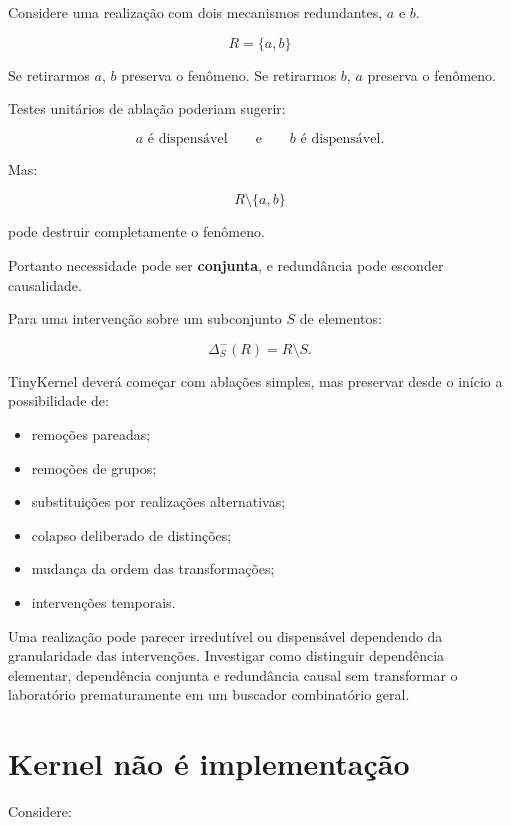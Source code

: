 \documentclass[11pt,a4paper]{article}
\begin{document}
Considere uma realização com dois mecanismos redundantes, \(a\) e \(b\).

\[
R=\{a,b\}
\]

Se retirarmos \(a\), \(b\) preserva o fenômeno.
Se retirarmos \(b\), \(a\) preserva o fenômeno.

Testes unitários de ablação poderiam sugerir:

\[
a\text{ é dispensável}
\qquad\text{e}\qquad
b\text{ é dispensável}.
\]

Mas:

\[
R\setminus\{a,b\}
\]

pode destruir completamente o fenômeno.

Portanto necessidade pode ser \textbf{conjunta}, e redundância pode esconder
causalidade.

Para uma intervenção sobre um subconjunto \(S\) de elementos:

\[
\Delta^{-}_{S}(R)=R\setminus S.
\]

TinyKernel deverá começar com ablações simples, mas preservar desde o início a
possibilidade de:

\begin{itemize}
  \item remoções pareadas;
  \item remoções de grupos;
  \item substituições por realizações alternativas;
  \item colapso deliberado de distinções;
  \item mudança da ordem das transformações;
  \item intervenções temporais.
\end{itemize}

\begin{markerbox}
Uma realização pode parecer irredutível ou dispensável dependendo da granularidade
das intervenções. Investigar como distinguir dependência elementar, dependência
conjunta e redundância causal sem transformar o laboratório prematuramente em um
buscador combinatório geral.
\end{markerbox}

\section{Kernel não é implementação}

Considere:
\end{document}

